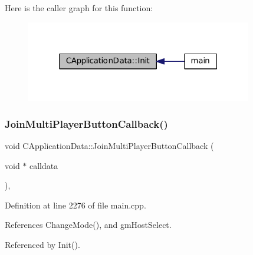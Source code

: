 Here is the caller graph for this function\+:\nopagebreak
\begin{figure}[H]
\begin{center}
\leavevmode
\includegraphics[width=280pt]{classCApplicationData_ab757e7ad037decb18cefa3f4ad2e1298_icgraph}
\end{center}
\end{figure}
\hypertarget{classCApplicationData_a4fa8cf7a67c0ae980d38e1fe7b967f41}{}\label{classCApplicationData_a4fa8cf7a67c0ae980d38e1fe7b967f41} 
\subsubsection{\texorpdfstring{Join\+Multi\+Player\+Button\+Callback()}{JoinMultiPlayerButtonCallback()}}
{\footnotesize\ttfamily void C\+Application\+Data\+::\+Join\+Multi\+Player\+Button\+Callback (\begin{DoxyParamCaption}\item[{void $\ast$}]{calldata }\end{DoxyParamCaption})\hspace{0.3cm}{\ttfamily [static]}, {\ttfamily [protected]}}



Definition at line 2276 of file main.\+cpp.



References Change\+Mode(), and gm\+Host\+Select.



Referenced by Init().


